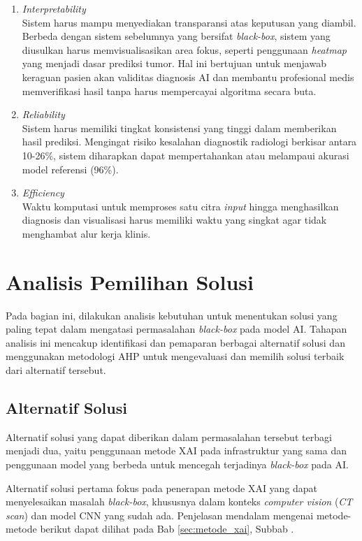 \begin{enumerate}
	\item \textit{Interpretability}\\
	Sistem harus mampu menyediakan transparansi atas keputusan yang diambil. Berbeda dengan sistem sebelumnya yang bersifat \textit{black-box}, sistem yang diusulkan harus memvisualisasikan area fokus, seperti penggunaan \textit{heatmap} yang menjadi dasar prediksi tumor. Hal ini bertujuan untuk menjawab keraguan pasien akan validitas diagnosis AI dan membantu profesional medis memverifikasi hasil tanpa harus mempercayai algoritma secara buta.
	
	\item \textit{Reliability}\\
	Sistem harus memiliki tingkat konsistensi yang tinggi dalam memberikan hasil prediksi. Mengingat risiko kesalahan diagnostik radiologi berkisar antara 10-26\%, sistem diharapkan dapat mempertahankan atau melampaui akurasi model referensi (96\%).
	
	\item \textit{Efficiency}\\
	Waktu komputasi untuk memproses satu citra \textit{input} hingga menghasilkan diagnosis dan visualisasi harus memiliki waktu yang singkat agar tidak menghambat alur kerja klinis.
\end{enumerate}

\section{Analisis Pemilihan Solusi}
Pada bagian ini, dilakukan analisis kebutuhan untuk menentukan solusi yang paling tepat dalam mengatasi permasalahan \textit{black-box} pada model AI. Tahapan analisis ini mencakup identifikasi dan pemaparan berbagai alternatif solusi dan menggunakan metodologi AHP untuk mengevaluasi dan memilih solusi terbaik dari alternatif tersebut.

\subsection{Alternatif Solusi}
Alternatif solusi yang dapat diberikan dalam permasalahan tersebut terbagi menjadi dua, yaitu penggunaan metode XAI pada infrastruktur yang sama dan penggunaan model yang berbeda untuk mencegah terjadinya \textit{black-box} pada AI.

Alternatif solusi pertama fokus pada penerapan metode XAI yang dapat menyelesaikan masalah \textit{black-box}, khususnya dalam konteks \textit{computer vision} (\textit{CT scan}) dan model CNN yang sudah ada. Penjelasan mendalam mengenai metode-metode berikut dapat dilihat pada Bab \ref{sec:metode_xai}, Subbab .

